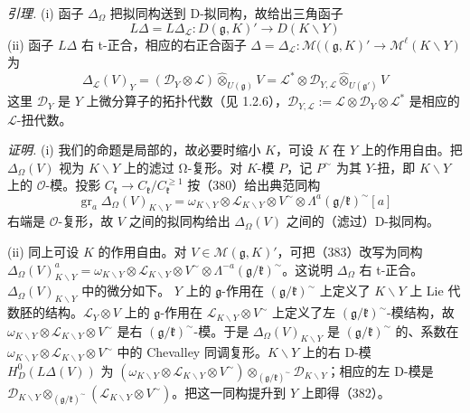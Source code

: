 \emph{引理.} (i) 函子 $\Delta_{\Omega}$ 把拟同构送到 D-拟同构，故给出三角函子
\begin{equation}\tag{381}
L\Delta=L\Delta_{\mathcal{L}}:D(\mathfrak{g},K)'\to D(K\backslash Y)
\end{equation}
(ii) 函子 $L\Delta$ 右 t-正合，相应的右正合函子 $\Delta=\Delta_{\mathcal{L}}:\mathcal{M}((\mathfrak{g},K)'\to\mathcal{M}^{\ell}(K\backslash Y)$ 为
\begin{equation}\tag{382}
\Delta_{\mathcal{L}}(V)_Y=(\mathcal{D}_Y\otimes\mathcal{L})\widehat{\otimes}_{U(\mathfrak{g})}V=\mathcal{L}^{*}\otimes\mathcal{D}_{Y,\mathcal{L}}\widehat{\otimes}_{U(\mathfrak{g}')}V
\end{equation}
这里 $\mathcal{D}_Y$ 是 $Y$ 上微分算子的拓扑代数（见 1.2.6），$\mathcal{D}_{Y,\mathcal{L}}:=\mathcal{L}\otimes\mathcal{D}_Y\otimes\mathcal{L}^{*}$ 是相应的 $\mathcal{L}$-扭代数。%

\emph{证明.} (i) 我们的命题是局部的，故必要时缩小 $K$，可设 $K$ 在 $Y$ 上的作用自由。把 $\Delta_{\Omega}(V)$ 视为 $K\backslash Y$ 上的滤过 Ω-复形。对 $K$-模 $P$，记 $P^{\sim}$ 为其 $Y$-扭，即 $K\backslash Y$ 上的 $\mathcal{O}$-模。投影 $C_{\mathfrak{k}}\to C_{\mathfrak{k}}/C_{\mathfrak{k}}^{\ge1}$ 按（380）给出典范同构
\begin{equation}\tag{383}
\operatorname{gr}_a\Delta_{\Omega}(V)_{K\backslash Y}=\omega_{K\backslash Y}\otimes\mathcal{L}_{K\backslash Y}\otimes V^{\sim}\otimes\Lambda^{a}(\mathfrak{g}/\mathfrak{k})^{\sim}[a]
\end{equation}
右端是 $\mathcal{O}$-复形，故 $V$ 之间的拟同构给出 $\Delta_{\Omega}(V)$ 之间的（滤过）D-拟同构。

(ii) 同上可设 $K$ 的作用自由。对 $V\in\mathcal{M}(\mathfrak{g},K)'$，可把（383）改写为同构 $\Delta_{\Omega}(V)^{a}_{K\backslash Y}=\omega_{K\backslash Y}\otimes\mathcal{L}_{K\backslash Y}\otimes V^{\sim}\otimes\Lambda^{-a}(\mathfrak{g}/\mathfrak{k})^{\sim}$。这说明 $\Delta_{\Omega}$ 右 t-正合。%
$\Delta_{\Omega}(V)_{K\backslash Y}$ 中的微分如下。%
$Y$ 上的 $\mathfrak{g}$-作用在 $(\mathfrak{g}/\mathfrak{k})^{\sim}$ 上定义了 $K\backslash Y$ 上 Lie 代数胚的结构。$\mathcal{L}_Y\otimes V$ 上的 $\mathfrak{g}$-作用在 $\mathcal{L}_{K\backslash Y}\otimes V^{\sim}$ 上定义了左 $(\mathfrak{g}/\mathfrak{k})^{\sim}$-模结构，故 $\omega_{K\backslash Y}\otimes\mathcal{L}_{K\backslash Y}\otimes V^{\sim}$ 是右 $(\mathfrak{g}/\mathfrak{k})^{\sim}$-模。于是 $\Delta_{\Omega}(V)_{K\backslash Y}$ 是 $(\mathfrak{g}/\mathfrak{k})^{\sim}$ 的、系数在 $\omega_{K\backslash Y}\otimes\mathcal{L}_{K\backslash Y}\otimes V^{\sim}$ 中的 Chevalley 同调复形。$K\backslash Y$ 上的右 D-模 $H^0_D(L\Delta(V))$ 为 $(\omega_{K\backslash Y}\otimes\mathcal{L}_{K\backslash Y}\otimes V^{\sim})\otimes_{(\mathfrak{g}/\mathfrak{k})^{\sim}}\mathcal{D}_{K\backslash Y}$；相应的左 D-模是 $\mathcal{D}_{K\backslash Y}\otimes_{(\mathfrak{g}/\mathfrak{k})^{\sim}}(\mathcal{L}_{K\backslash Y}\otimes V^{\sim})$。把这一同构提升到 $Y$ 上即得（382）。

